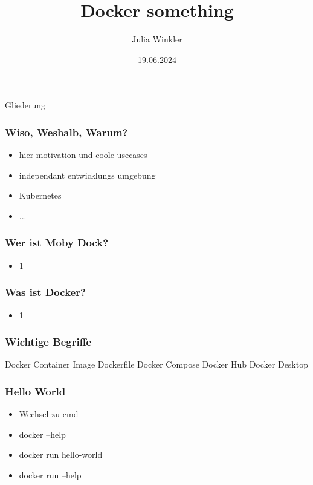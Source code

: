 \documentclass[22pt]{beamer}
\title{Docker something}
\author{Julia Winkler}
\date{19.06.2024}
\begin{document}
\maketitle

\begin{frame}{Gliederung}
    \tableofcontents
\end{frame}


\begin{frame}[t]
    \frametitle{Wiso, Weshalb, Warum?}
    \begin{itemize}
        \item hier motivation und coole usecases
        \item independant entwicklungs umgebung \pause
        \item Kubernetes \pause
        \item ...
    \end{itemize}
\end{frame}

\begin{frame}[t]
    \frametitle{Wer ist Moby Dock?}
    \begin{itemize}
        \item 1
    \end{itemize} 
\end{frame}

\begin{frame}[t]
    \frametitle{Was ist Docker?}
    \begin{itemize}
        \item 1
    \end{itemize} 
\end{frame}

\begin{frame}[t]
    \frametitle{Wichtige Begriffe}
    Docker
    Container
    Image
    Dockerfile
    Docker Compose
    Docker Hub
    Docker Desktop
\end{frame}

\begin{frame}[t]
    \frametitle{Hello World}
    \begin{itemize}
        \item Wechsel zu cmd
        \item docker --help
        \item docker run hello-world
        \item docker run --help
    \end{itemize} 
\end{frame}
\end{document}

